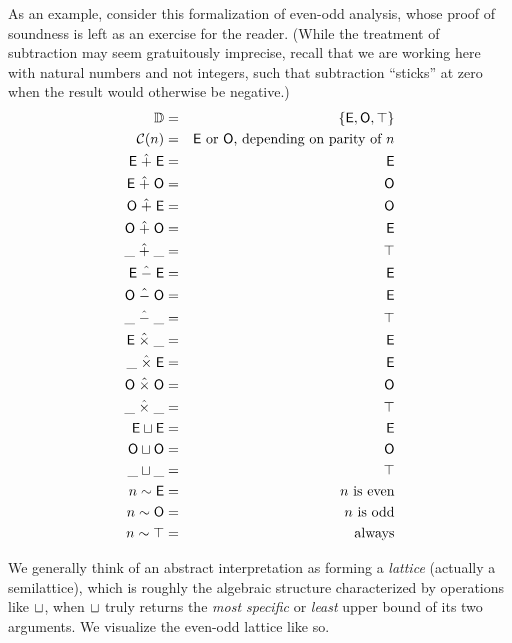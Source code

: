 \documentclass{amsbook}
\theoremstyle{definition}
\theoremstyle{remark}
\numberwithin{section}{chapter}
\numberwithin{equation}{chapter}
\begin{document}
As an example, consider this formalization of even-odd analysis, whose proof of soundness is left as an exercise for the reader.
(While the treatment of subtraction may seem gratuitously imprecise, recall that we are working here with natural numbers and not integers, such that subtraction ``sticks'' at zero when the result would otherwise be negative.)
\begin{eqnarray*}
  \mathbb D &=& \{\mathsf{E}, \mathsf{O}, \top\} \\
  \mathcal C(n) &=& \textrm{$\mathsf{E}$ or $\mathsf{O}$, depending on parity of $n$} \\
  \mathsf{E} \; \hat{+} \; \mathsf{E} &=& \mathsf{E} \\
  \mathsf{E} \; \hat{+} \; \mathsf{O} &=& \mathsf{O} \\
  \mathsf{O} \; \hat{+} \; \mathsf{E} &=& \mathsf{O} \\
  \mathsf{O} \; \hat{+} \; \mathsf{O} &=& \mathsf{E} \\
  \_ \; \hat{+} \; \_ &=& \top \\
  \mathsf{E} \; \hat{-} \; \mathsf{E} &=& \mathsf{E} \\
  \mathsf{O} \; \hat{-} \; \mathsf{O} &=& \mathsf{E} \\
  \_ \; \hat{-} \; \_ &=& \top \\
  \mathsf{E} \; \hat{\times} \; \_ &=& \mathsf{E} \\
  \_ \; \hat{\times} \; \mathsf{E} &=& \mathsf{E} \\
  \mathsf{O} \; \hat{\times} \; \mathsf{O} &=& \mathsf{O} \\
  \_ \; \hat{\times} \; \_ &=& \top \\
  \mathsf{E} \sqcup \mathsf{E} &=& \mathsf{E} \\
  \mathsf{O} \sqcup \mathsf{O} &=& \mathsf{O} \\
  \_ \sqcup \_ &=& \top \\
  n \sim \mathsf{E} &=& \textrm{$n$ is even} \\
  n \sim \mathsf{O} &=& \textrm{$n$ is odd} \\
  n \sim \top &=& \textrm{always}
\end{eqnarray*}

We generally think of an abstract interpretation as forming a \emph{lattice} (actually a semilattice), which is roughly the algebraic structure characterized by operations like $\sqcup$, when $\sqcup$ truly returns the \emph{most specific} or \emph{least} upper bound of its two arguments.  We visualize the even-odd lattice like so.

\begin{center}\end{center}
\end{document}
